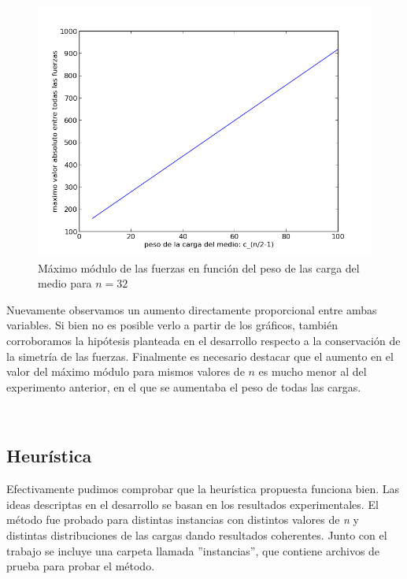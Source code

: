 \begin{figure}[!h]
	\begin{center}
		  \includegraphics[scale=0.4]{Imagenes/variable_cis/just_middle_ci/just_middle_ci_n_32}
		  \caption{Máximo módulo de las fuerzas en función del peso de las carga del medio para $n=32$}
		  \label{fig:contra1}
	\end{center}
\end{figure}

Nuevamente observamos un aumento directamente proporcional entre ambas variables. Si bien no es posible verlo a partir de
los gráficos, también corroboramos la hipótesis planteada en el desarrollo respecto a la conservación de la
simetría de las fuerzas. Finalmente es necesario destacar que el aumento en el 
valor del máximo módulo para mismos valores de $n$ es mucho menor al del experimento anterior, en el que se aumentaba
el peso de todas las cargas.

~

\subsection{Heurística}

Efectivamente pudimos comprobar que la heurística propuesta funciona bien. Las ideas descriptas en el desarrollo se basan
en los resultados experimentales. El método fue probado para distintas instancias con
distintos valores de \emph{n} y distintas distribuciones de las cargas dando resultados coherentes.
Junto con el trabajo se incluye una carpeta llamada ''instancias'', que contiene archivos de prueba para probar el método.











